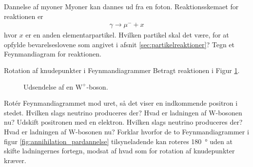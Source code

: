 \begin{opgave}{Dannelse af myoner}
    Myoner kan dannes ud fra en foton. Reaktionsskemaet for reaktionen er
    \begin{align}
        \gamma \rightarrow \mu^- + x
    \end{align}
    hvor $x$ er en anden elementarpartikel.
    \opg Hvilken partikel skal det være, for at opfylde bevarelseslovene som angivet i afsnit \ref{sec:partikelreaktioner}?
    \opg Tegn et Feynmandiagram for reaktionen.
\end{opgave}

\begin{opgave}{Rotation af knudepunkter i Feynmandiagrammer} \label{opg:rotation_af_Feynman}
    Betragt reaktionen i Figur \ref{fig:Wvertex}.
    \begin{figure}[h]
        \centering
        \caption{Udsendelse af en $\mathrm{W}^+$-boson.}
        \label{fig:Wvertex}
    \end{figure}
    \opg Rotér Feynmandiagrammet mod uret, så det viser en indkommende positron i stedet. Hvilken slags neutrino produceres der?
    \opg Hvad er ladningen af $\mathrm{W}$-bosonen nu?
    \opg Udskift positronen med en elektron. Hvilken slags neutrino produceres der?
    \opg Hvad er ladningen af $\mathrm{W}$-bosonen nu?
    \opg Forklar hvorfor de to Feynmandiagrammer i figur \ref{fig:annihilation_pardannelse} tilsyneladende kan roteres \SI{180}{\degree} uden at skifte ladningernes fortegn, modsat af hvad som for rotation af knudepunkter kræver.
\end{opgave}

